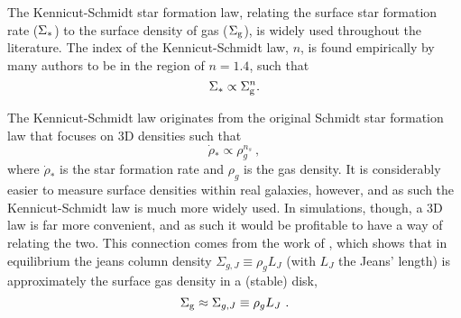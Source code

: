 The Kennicut-Schmidt star formation law, relating the surface star formation rate ($\Sigma_*$) to the surface density of gas ($\Sigma_\mathrm{g}$), is widely used throughout the literature.
The index of the Kennicut-Schmidt law, $n$, is found empirically by many authors \citep{kennicutt_star_1989, kennicutt_star_2007, bigiel_star_2008} to be in the region of $n=1.4$, such that
\begin{equation}
\label{eqn:ks}
\Sigma_* \propto \Sigma_\mathrm{g}^n.
\end{equation}

The Kennicut-Schmidt law originates from the original Schmidt star formation law  \cite{schmidt_rate_1959} that focuses on 3D densities such that
\begin{equation}
\label{eqn:s}
\dot{\rho}_* \propto \rho_g^{n_s}~,
\end{equation}
where $\dot{\rho}_*$ is the star formation rate and $\rho_g$ is the gas density.
It is considerably easier to measure surface densities within real galaxies, however, and as such the Kennicut-Schmidt law is much more widely used.
In simulations, though, a 3D law is far more convenient, and as such it would be profitable to have a way of relating the two. 
This connection comes from the work of \citet{schaye_model-independent_2001}, which shows that in equilibrium the jeans column density $\Sigma_{g, J} \equiv \rho_g L_J$ (with $L_J$ the Jeans' length) is approximately the surface gas density in a (stable) disk,
\begin{equation}
\label{eqn:s04}
\Sigma_\mathrm{g} \approx \Sigma_{g, J} \equiv \rho_g L_J~.
\end{equation}
